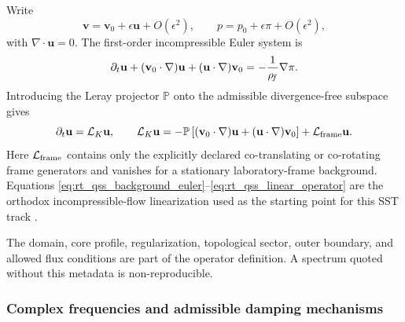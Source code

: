        Write
        \begin{equation}
            \mathbf v
            =
            \mathbf v_0+\epsilon\mathbf u+O(\epsilon^2),
            \qquad
            p
            =
            p_0+\epsilon\pi+O(\epsilon^2),
        \end{equation}
        with \(\nabla\cdot\mathbf u=0\).  The first-order incompressible Euler system is
        \begin{equation}
            \partial_t\mathbf u
            +
            (\mathbf v_0\cdot\nabla)\mathbf u
            +
            (\mathbf u\cdot\nabla)\mathbf v_0
            =
            -\frac{1}{\rho_{\!f}}\nabla\pi.
            \label{eq:rt_qss_linearized_euler}
        \end{equation}
        Introducing the Leray projector \(\mathbb P\) onto the admissible
        divergence-free subspace gives
        \begin{equation}
            \partial_t\mathbf u
            =
            \mathcal L_K\mathbf u,
            \qquad
            \mathcal L_K\mathbf u
            =
            -\mathbb P
            \left[
                (\mathbf v_0\cdot\nabla)\mathbf u
                +
                (\mathbf u\cdot\nabla)\mathbf v_0
            \right]
            +
            \mathcal L_{\rm frame}\mathbf u.
            \label{eq:rt_qss_linear_operator}
        \end{equation}
        Here \(\mathcal L_{\rm frame}\) contains only the explicitly declared
        co-translating or co-rotating frame generators and vanishes for a stationary
        laboratory-frame background.  Equations
        \eqref{eq:rt_qss_background_euler}--\eqref{eq:rt_qss_linear_operator} are the
        orthodox incompressible-flow linearization used as the starting point for this
        SST track \cite{MajdaBertozzi2002}.

        The domain, core profile, regularization, topological sector, outer boundary,
        and allowed flux conditions are part of the operator definition.  A spectrum
        quoted without this metadata is non-reproducible.

    \subsubsection*{Complex frequencies and admissible damping mechanisms}

